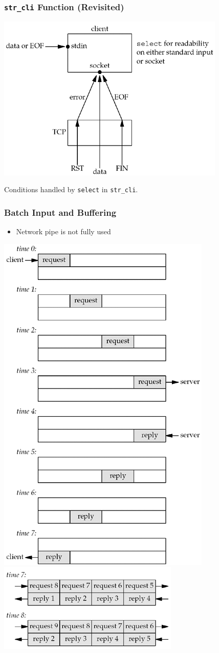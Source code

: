 \documentclass[notes,serif]{beamer}
\begin{document}
\begin{frame}
\frametitle{\texttt{str\_cli} Function (Revisited)}
  \begin{center}
  \includegraphics[width=.6\textwidth]{figs/06fig08.png}
  \end{center}
  Conditions handled by \texttt{select} in \texttt{str\_cli}.
\end{frame}

\begin{frame}
\frametitle{Batch Input and Buffering}
\begin{itemize}
  \item Network pipe is not fully used
\end{itemize}
 \begin{center}
  \includegraphics[width=.3\textwidth]{figs/06fig10.png}
  \hspace{2em}
  \includegraphics[width=.6\textwidth]{figs/06fig11.png}
  \end{center}
\end{frame}
\end{document}
